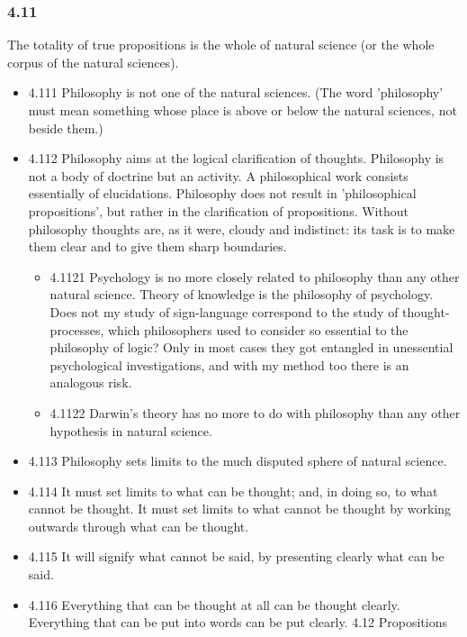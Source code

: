 \documentclass[11pt]{article}
\begin{document}
\subsubsection*{4.11}
\label{sec:org966eee5}
The totality of true propositions is the whole of natural science (or
the whole corpus of the natural sciences).
\begin{itemize}
\item 4.111
\label{sec:orga5cf7a8}
Philosophy is not one of the natural sciences. (The word 'philosophy'
must mean something whose place is above or below the natural sciences, not
beside them.)
\item 4.112
\label{sec:org7dc96cf}
Philosophy aims at the logical clarification of thoughts. Philosophy
is not a body of doctrine but an activity. A philosophical work consists
essentially of elucidations. Philosophy does not result in 'philosophical
propositions', but rather in the clarification of propositions. Without
philosophy thoughts are, as it were, cloudy and indistinct: its task is to
make them clear and to give them sharp boundaries.
\begin{itemize}
\item 4.1121
\label{sec:org3cdf469}
Psychology is no more closely related to philosophy than any other
natural science. Theory of knowledge is the philosophy of psychology. Does
not my study of sign-language correspond to the study of thought-processes,
which philosophers used to consider so essential to the philosophy of
logic? Only in most cases they got entangled in unessential psychological
investigations, and with my method too there is an analogous risk.
\item 4.1122
\label{sec:org6cebdd9}
Darwin's theory has no more to do with philosophy than any other
hypothesis in natural science.
\end{itemize}
\item 4.113
\label{sec:orgbd9372a}
Philosophy sets limits to the much disputed sphere of natural
science.
\item 4.114
\label{sec:orgabbdcf8}
It must set limits to what can be thought; and, in doing so, to what
cannot be thought. It must set limits to what cannot be thought by working
outwards through what can be thought.
\item 4.115
\label{sec:org76a5eb5}
It will signify what cannot be said, by presenting clearly what can
be said.
\item 4.116
\label{sec:org93e8392}
Everything that can be thought at all can be thought clearly.
Everything that can be put into words can be put clearly. 4.12 Propositions

\end{itemize}
\end{document}
